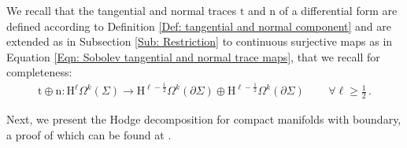 \begin{remark}\label{Rmk: extension of tangential and normal maps to Sobolev spaces}
	We recall that the tangential and normal traces $\mathrm{t}$ and $\mathrm{n}$ of a differential form are defined according to Definition \ref{Def: tangential and normal component} and are extended as in Subsection \ref{Sub: Restriction} to continuous surjective maps as in Equation \eqref{Eqn: Sobolev tangential and normal trace maps}, that we recall for completeness:
	\begin{align}
	\mathrm{t}\oplus\mathrm{n}\colon
	\mathrm{H}^\ell\Omega^k(\Sigma)\to
	\mathrm{H}^{\ell-\frac{1}{2}}\Omega^k(\partial\Sigma)\oplus
	\mathrm{H}^{\ell-\frac{1}{2}}\Omega^k(\partial\Sigma)\,\qquad\forall\ell\geq\frac{1}{2}\,.
	\end{align}
\end{remark}
Next, we present the Hodge decomposition for compact manifolds with boundary, a proof of which can be found at \parencite[Thm. 2.4.2]{Schwarz-95}.
